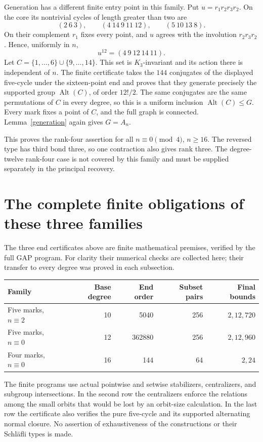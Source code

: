 \documentclass[11pt]{article}
\newcommand{\Alt}{\operatorname{Alt}}
\begin{document}
Generation has a different finite entry point in this family. Put
$u=r_1r_2r_3r_2$. On the core its nontrivial cycles of length greater
than two are
\[
 (2\ 6\ 3),\qquad(4\ 14\ 9\ 11\ 12),\qquad(5\ 10\ 13\ 8).
\]
On their complement $r_1$ fixes every point, and $u$ agrees with the
involution $r_2r_3r_2$. Hence, uniformly in $n$,
\[
 u^{12}=(4\ 9\ 12\ 14\ 11).
\]
Let $C=\{1,\ldots,6\}\cup\{9,\ldots,14\}$. This set is
$K_3$-invariant and its action there is independent of $n$. The finite
certificate takes the $144$ conjugates of the displayed five-cycle
under the sixteen-point end and proves that they generate precisely
the supported group $\Alt(C)$, of order $12!/2$. The same conjugates
are the same permutations of $C$ in every degree, so this is a uniform
inclusion $\Alt(C)\leq G$. Every mark fixes a point of $C$, and the
full graph is connected. Lemma~\ref{generation} again gives $G=A_n$.

This proves the rank-four assertion for all $n\equiv0\pmod4$,
$n\geq16$. The reversed type has third bond three, so one contraction
also gives rank three. The degree-twelve rank-four case is not covered
by this family and must be supplied separately in the principal recovery.

\section{The complete finite obligations of these three families}
The three end certificates above are finite mathematical premises,
verified by the full GAP program. For clarity their numerical checks
are collected here; their transfer to every degree was proved in each
subsection.
\begin{center}\small
\begin{tabular}{lrrrr}
\toprule
Family & Base degree & End order & Subset pairs & Final bounds\\\midrule
Five marks, $n\equiv2$ &10&5040&256&$2,12,720$\\
Five marks, $n\equiv0$ &12&362880&256&$2,12,960$\\
Four marks, $n\equiv0$ &16&144&64&$2,24$\\\bottomrule
\end{tabular}
\end{center}
The finite programs use actual pointwise and setwise stabilizers,
centralizers, and subgroup intersections. In the second row the
centralizers enforce the relations among the small orbits that would
be lost by an orbit-size calculation. In the last row the certificate
also verifies the pure five-cycle and its supported alternating normal
closure. No assertion of exhaustiveness of the constructions or their
Schl\"afli types is made.
\end{document}
